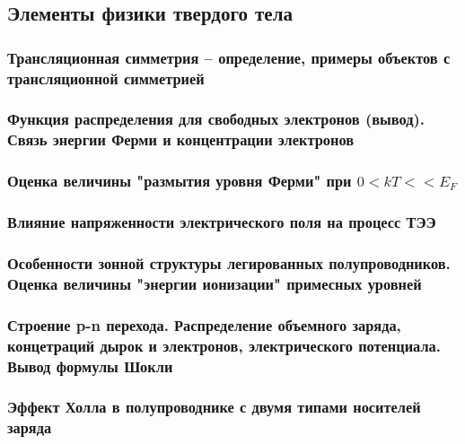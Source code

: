 \subsection{Элементы физики твердого тела}

\subsubsection{Трансляционная симметрия --  определение, примеры объектов с трансляционной симметрией}

\subsubsection{Функция распределения для свободных электронов (вывод). Связь энергии Ферми и концентрации электронов}

\subsubsection{Оценка величины "размытия уровня Ферми" при $0 < kT << E_F$}

\subsubsection{Влияние напряженности электрического поля на процесс ТЭЭ}

\subsubsection{Особенности зонной структуры легированных полупроводников. Оценка величины "энергии ионизации" примесных уровней}

\subsubsection{Строение p-n перехода. Распределение объемного заряда, концетраций дырок и электронов, электрического потенциала. Вывод формулы Шокли}

\subsubsection{Эффект Холла в полупроводнике с двумя типами носителей заряда}

